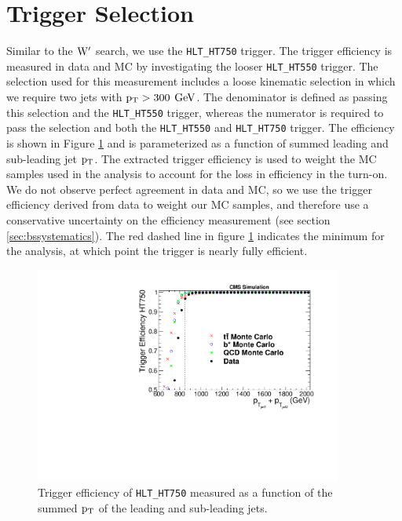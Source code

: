 \section{Trigger Selection}
\label{sec:bstrigger}
Similar to the $\mathrm{W}^{\prime}$ search, we use the \texttt{HLT\_HT750} trigger. 
The trigger efficiency is measured in data and MC by investigating the looser \texttt{HLT\_HT550} trigger.  The selection used for this measurement includes a 
loose kinematic selection in which we require two jets with $\mathrm{p_{T}} > 300$ $\mathrm{GeV}$.
The denominator is defined as passing this selection and the \texttt{HLT\_HT550} trigger, whereas the 
numerator is required to pass the selection and both the \texttt{HLT\_HT550} and \texttt{HLT\_HT750} trigger.  
The efficiency is shown in Figure \ref{figs:bsTrigger_Comparison_Ht} and is parameterized as a function of summed leading and sub-leading jet $\mathrm{p_{T}}$.  The extracted trigger efficiency is used to weight 
the MC samples used in the analysis to account for the loss in efficiency in the turn-on.  We do not observe perfect agreement in data and MC, 
so we use the trigger efficiency derived from data to weight our MC samples, and therefore use a conservative uncertainty on the efficiency measurement (see section \ref{sec:bssystematics}).  
The red dashed line in figure \ref{figs:bsTrigger_Comparison_Ht} indicates the minimum for the analysis, 
at which point the trigger is nearly fully efficient.

\begin{figure}[htcb]
\centering
\includegraphics[width=0.9\textwidth]{AN-14-049/figs/Trigger_Comparison_Htdijet.pdf}
\caption{Trigger efficiency of \texttt{HLT\_HT750} measured as a function of the summed $\mathrm{p_{T}}$ of the leading and sub-leading jets.  }
\label{figs:bsTrigger_Comparison_Ht}
\end{figure}

